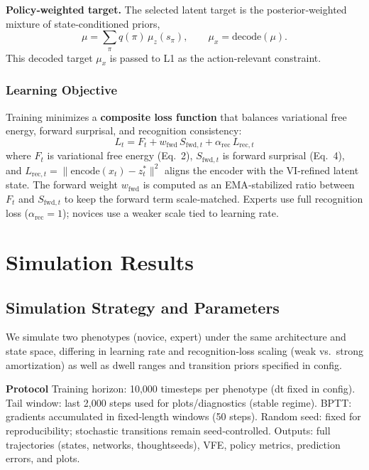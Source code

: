 \documentclass[openacc]{rsproca_new}%
\begin{document}
\textbf{Policy‑weighted target.}
The selected latent target is the posterior‑weighted mixture of state‑conditioned priors,
\begin{equation}
\mu = \sum_{\pi} q(\pi)\, \mu_z(s_\pi), 
\qquad
\mu_x = \mathrm{decode}(\mu).
\tag{8}
\end{equation}
This decoded target \(\mu_x\) is passed to L1 as the action‑relevant constraint.

\subsubsection{Learning Objective}

Training minimizes a \textbf{composite loss function} that balances variational free energy, forward surprisal, and recognition consistency:
\[
L_t = F_t + w_{\mathrm{fwd}}\, S_{\mathrm{fwd},t} + \alpha_{\mathrm{rec}}\, L_{\mathrm{rec},t}
\tag{9}
\]
where \(F_t\) is variational free energy (Eq.~2), \(S_{\mathrm{fwd},t}\) is forward surprisal (Eq.~4), and
\(L_{\mathrm{rec},t} = \lVert \mathrm{encode}(x_t) - z_t^{*} \rVert^2\) aligns the encoder with the VI‑refined latent state.
The forward weight \(w_{\mathrm{fwd}}\) is computed as an EMA‑stabilized ratio between \(F_t\) and \(S_{\mathrm{fwd},t}\) to keep the forward term scale‑matched. Experts use full recognition loss (\(\alpha_{\mathrm{rec}}=1\)); novices use a weaker scale tied to learning rate.

\section{Simulation Results}

\subsection{Simulation Strategy and Parameters}

We simulate two phenotypes (novice, expert) under the same architecture and state space, differing in learning rate and recognition‑loss scaling (weak vs.\ strong amortization) as well as dwell ranges and transition priors specified in config.

\textbf{Protocol}  
Training horizon: 10{,}000 timesteps per phenotype (dt fixed in config).  
Tail window: last 2{,}000 steps used for plots/diagnostics (stable regime).  
BPTT: gradients accumulated in fixed‑length windows (50 steps).  
Random seed: fixed for reproducibility; stochastic transitions remain seed‑controlled.  
Outputs: full trajectories (states, networks, thoughtseeds), VFE, policy metrics, prediction errors, and plots.
\end{document}

